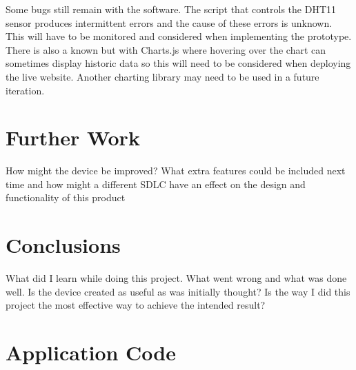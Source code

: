 \documentclass[10pt,a4paper]{article}
\begin{document}
Some bugs still remain with the software. The script that controls the DHT11 sensor produces intermittent errors and the cause of these errors is unknown. This will have to be monitored and considered when implementing the prototype. There is also a known but with Charts.js where hovering over the chart can sometimes display historic data so this will need to be considered when deploying the live website. Another charting library may need to be used in a future iteration. 

\pagebreak
\section{Further Work}
How might the device be improved? What extra features could be included next time and how might a different SDLC have an effect on the design and functionality of this product

\pagebreak
\section{Conclusions}
What did I learn while doing this project. What went wrong and what was done well. Is the device created as useful as was initially thought? Is the way I did this project the most effective way to achieve the intended result? 

\pagebreak

\appendix
\section{Application Code}
\end{document}
